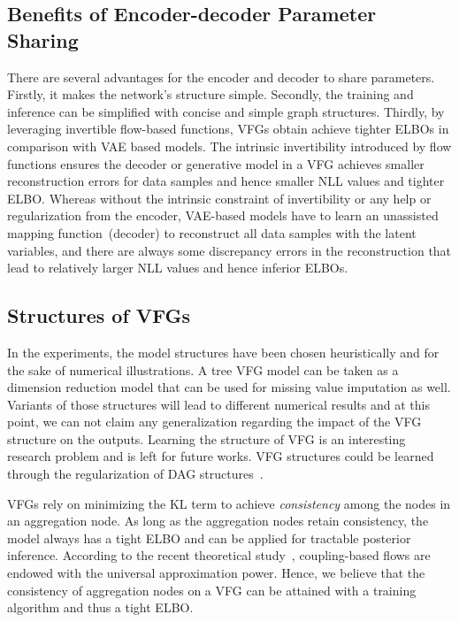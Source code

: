 \documentclass[sigconf, anonymous, review]{acmart}
\theoremstyle{plain}
\theoremstyle{definition}
\theoremstyle{remark}
\begin{document}
\subsection{Benefits of Encoder-decoder Parameter Sharing}
There are several advantages for the encoder and decoder to share parameters. 
 Firstly, it makes the network's structure simple. 
 Secondly, the training and inference can be simplified with concise and simple graph structures. 
 Thirdly, by leveraging invertible flow-based functions, VFGs obtain achieve tighter ELBOs in comparison with VAE based models.%
 The intrinsic invertibility introduced by flow functions ensures the decoder or generative model in a VFG  achieves smaller reconstruction errors for data samples and hence smaller NLL values and tighter ELBO. Whereas without the intrinsic constraint of invertibility or any help or regularization from the encoder, VAE-based models have to learn an unassisted mapping function~(decoder) to reconstruct all data samples with the latent variables, and there are always some discrepancy errors in the reconstruction that lead to relatively larger NLL values and hence inferior ELBOs.

\subsection{Structures of VFGs}
 In the experiments, the model structures have been chosen heuristically and for the sake of numerical illustrations. A tree VFG model can be taken as a dimension reduction model that can be used for missing value imputation as well. Variants of those structures will lead to different numerical results and at this point, we can not claim any generalization regarding the impact of the VFG structure on the outputs. Learning the structure of VFG is an interesting research problem and is left for future works.  VFG structures could be learned through the regularization of DAG structures~\cite{Zheng2018,wehenkel2021graphical}.
 
 VFGs rely on minimizing the KL term to achieve  \emph{consistency} among the nodes in an aggregation node. As long as the aggregation nodes retain consistency, the model always has a tight ELBO and can be applied for tractable posterior inference. 
 According to the recent theoretical study~\cite{teshima2020coupling}, coupling-based flows are endowed with the universal approximation power. 
 Hence, we believe that the consistency of aggregation nodes on a  VFG can be attained with a training algorithm and thus a tight ELBO. 
\end{document}
